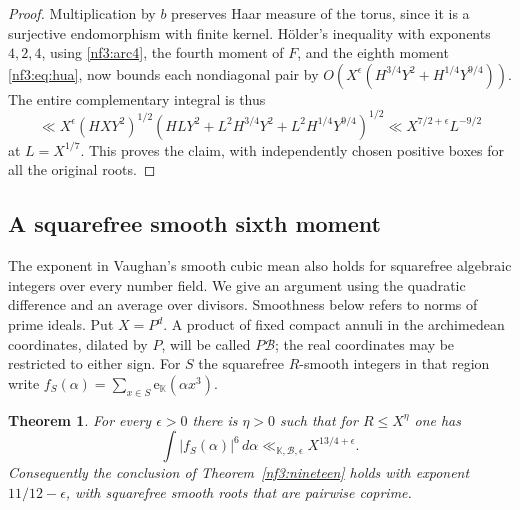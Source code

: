 \documentclass[11pt,letterpaper]{article}
\newtheorem{theorem}{Theorem}[section]
\theoremstyle{definition}
\numberwithin{equation}{section}
\begin{document}
\begin{proof}
Multiplication by $b$ preserves Haar measure of the torus, since it
is a surjective endomorphism with finite kernel. H\"older's inequality
with exponents $4,2,4$, using \eqref{nf3:arc4}, the fourth moment of
$F$, and the eighth moment \eqref{nf3:eq:hua}, now bounds each nondiagonal
pair by $O(X^\epsilon(H^{3/4}Y^2+H^{1/4}Y^{9/4}))$.
The entire complementary integral is thus
\[
 \ll X^\epsilon (HXY^2)^{1/2}
       (HLY^2+L^2H^{3/4}Y^2+L^2H^{1/4}Y^{9/4})^{1/2}
 \ll X^{7/2+\epsilon}L^{-9/2}
\]
at $L=X^{1/7}$. This proves the claim, with independently chosen
positive boxes for all the original roots.
\end{proof}

\subsection{A squarefree smooth sixth moment}\label{nf3:smoothsec}
The exponent in Vaughan's smooth cubic mean
\cite{nf3:vaughan89} also holds for squarefree algebraic integers
over every number field. We give an argument using the quadratic
difference and an average over divisors. Smoothness below refers to
norms of prime ideals. Put $X=P^d$. A product of fixed compact
annuli in the archimedean coordinates, dilated by $P$, will be
called $P\mathcal B$; the real coordinates may be restricted to
either sign. For $S$ the squarefree $R$-smooth integers in that
region write $f_S(\alpha)=\sum_{x\in S}\mathrm e_{\mathbb K}(\alpha x^3)$.
\begin{theorem}\label{nf3:smoothsix}
For every $\epsilon>0$ there is $\eta>0$ such that for
$R\le X^\eta$ one has
\[
             \int |f_S(\alpha)|^6\,d\alpha
                 \ll_{\mathbb K,\mathcal B,\epsilon}X^{13/4+\epsilon}.
\]
Consequently the conclusion of Theorem~\ref{nf3:nineteen} holds
with exponent $11/12-\epsilon$, with squarefree smooth roots that
are pairwise coprime.
\end{theorem}
\end{document}
